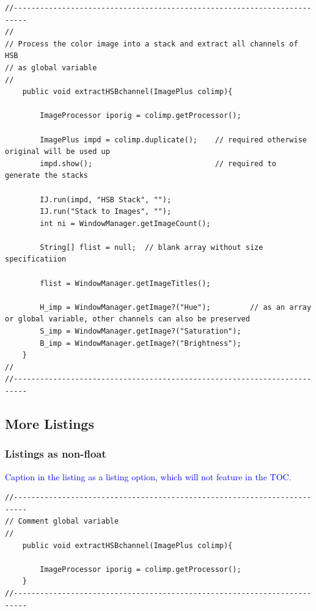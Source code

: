 \documentclass[phd,showframe]{ndsu-thesis-2022}
\newcommand\italk[1]{\textcolor{blue}{#1}}  %
\begin{document}
{\singlespacing
\begin{lstlisting}
//-------------------------------------------------------------------------
//
// Process the color image into a stack and extract all channels of HSB 
// as global variable
//
	public void extractHSBchannel(ImagePlus colimp){

		ImageProcessor iporig = colimp.getProcessor();
		
		ImagePlus impd = colimp.duplicate();	// required otherwise original will be used up
		impd.show();						    // required to generate the stacks
		
		IJ.run(impd, "HSB Stack", "");
		IJ.run("Stack to Images", "");
		int ni = WindowManager.getImageCount();

		String[] flist = null;  // blank array without size specificatiion

		flist = WindowManager.getImageTitles();
		
		H_imp = WindowManager.getImage?("Hue");			// as an array or global variable, other channels can also be preserved
		S_imp = WindowManager.getImage?("Saturation");
		B_imp = WindowManager.getImage?("Brightness");
	}	
//
//-------------------------------------------------------------------------	
\end{lstlisting}
}

\subsection{More Listings}

\subsubsection{Listings as non-float}

\italk{Caption in the listing as a listing option, which will not feature in the TOC.}

{\singlespacing
\begin{lstlisting}[frameround=fttt, caption = {Caption in listing as option.}, captionpos=b]
//-------------------------------------------------------------------------
// Comment global variable
//
	public void extractHSBchannel(ImagePlus colimp){

		ImageProcessor iporig = colimp.getProcessor();
	}	
//-------------------------------------------------------------------------	
\end{lstlisting}
}
\end{document}
